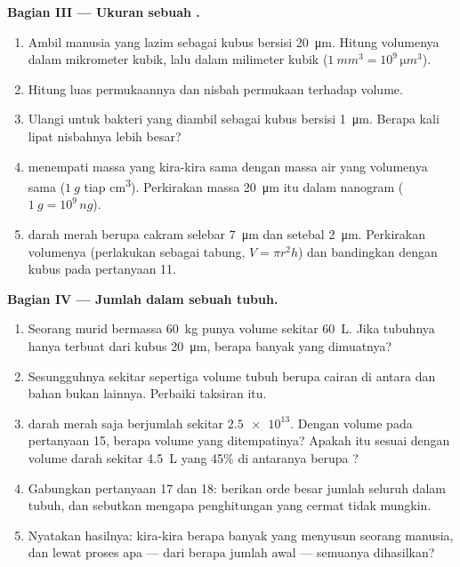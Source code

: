 \begin{problem}
\medskip
\noindent\textbf{Bagian III --- Ukuran sebuah .}
\begin{enumerate}[resume]
  \item Ambil  manusia yang lazim sebagai kubus bersisi \qty{20}{\micro m}.
        Hitung volumenya dalam mikrometer kubik, lalu dalam milimeter
        kubik ($\qty{1}{mm^3} = 10^9\,\unit{\micro m^3}$).
  \item Hitung luas permukaannya dan nisbah permukaan terhadap volume.
  \item Ulangi untuk bakteri yang diambil sebagai kubus bersisi
        \qty{1}{\micro m}. Berapa kali lipat nisbahnya lebih besar?
  \item {} menempati massa yang kira-kira sama dengan massa air yang
        volumenya sama ($\qty{1}{g}$ tiap \unit{cm^3}). Perkirakan massa
         \qty{20}{\micro m} itu dalam nanogram
        ($\qty{1}{g} = 10^9\,\unit{ng}$).
  \item {} darah merah berupa cakram selebar \qty{7}{\micro m} dan
        setebal \qty{2}{\micro m}. Perkirakan volumenya (perlakukan
        sebagai tabung, $V = \pi r^2 h$) dan bandingkan dengan kubus
        pada pertanyaan 11.
\end{enumerate}

\medskip
\noindent\textbf{Bagian IV --- Jumlah  dalam sebuah tubuh.}
\begin{enumerate}[resume]
  \item Seorang murid bermassa \qty{60}{kg} punya volume sekitar
        \qty{60}{L}. Jika tubuhnya hanya terbuat dari  kubus
        \qty{20}{\micro m}, berapa banyak  yang dimuatnya?
  \item Sesungguhnya sekitar sepertiga volume tubuh berupa cairan di
        antara  dan bahan bukan  lainnya. Perbaiki taksiran itu.
  \item {} darah merah saja berjumlah sekitar $\num{2.5e13}$. Dengan
        volume pada pertanyaan 15, berapa volume yang ditempatinya?
        Apakah itu sesuai dengan volume darah sekitar \qty{4.5}{L} yang
        45\% di antaranya berupa ?
  \item Gabungkan pertanyaan 17 dan 18: berikan orde besar jumlah
        seluruh  dalam tubuh, dan sebutkan mengapa penghitungan yang
        cermat tidak mungkin.
  \item Nyatakan hasilnya: kira-kira berapa banyak  yang menyusun
        seorang manusia, dan lewat proses apa --- dari berapa jumlah
        awal --- semuanya dihasilkan?
\end{enumerate}
\end{problem}

